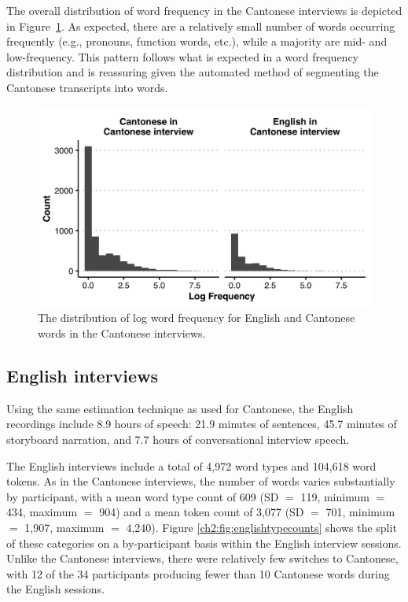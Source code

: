 The overall distribution of word frequency in the Cantonese interviews is depicted in Figure~\ref{ch2:fig:cantonesewordfrequency}. As expected, there are a relatively small number of words occurring frequently (e.g., pronouns, function words, etc.), while a majority are mid- and low-frequency. This pattern follows what is expected in a word frequency distribution and is reassuring given the automated method of segmenting the Cantonese transcripts into words. 

\begin{figure}[ht]
  \begin{center}
  \includegraphics[width=4.9in]{figures/ch2_cantonesewordfrequency_5in.png} 
  \caption{The distribution of log word frequency for English and Cantonese words in the Cantonese interviews.}
  \label{ch2:fig:cantonesewordfrequency}
  \end{center}
  \end{figure}

\subsection{English interviews}\label{ch2:subsec:english_descriptive}

Using the same estimation technique as used for Cantonese, the English recordings include 8.9 hours of speech: 21.9 minutes of sentences, 45.7 minutes of storyboard narration, and 7.7 hours of conversational interview speech.

The English interviews include a total of 4,972 word types and 104,618 word tokens. As in the Cantonese interviews, the number of words varies substantially by participant, with a mean word type count of 609 (SD $=$ 119, minimum $=$ 434, maximum $=$ 904) and a mean token count of 3,077 (SD $=$ 701, minimum $=$ 1,907, maximum $=$ 4,240). Figure \ref{ch2:fig:englishtypecounts} shows the split of these categories on a by-participant basis within the English interview sessions. Unlike the Cantonese interviews, there were relatively few switches to Cantonese, with 12 of the 34 participants producing fewer than 10 Cantonese words during the English sessions.

